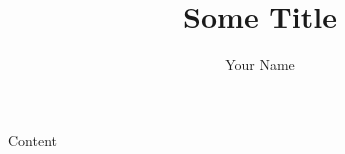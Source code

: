 \documentclass[a4paper,11pt]{article}
\title{Some Title}
\author{Your Name}
\begin{document}
\maketitle\thispagestyle{fancy}

Content
\end{document}
